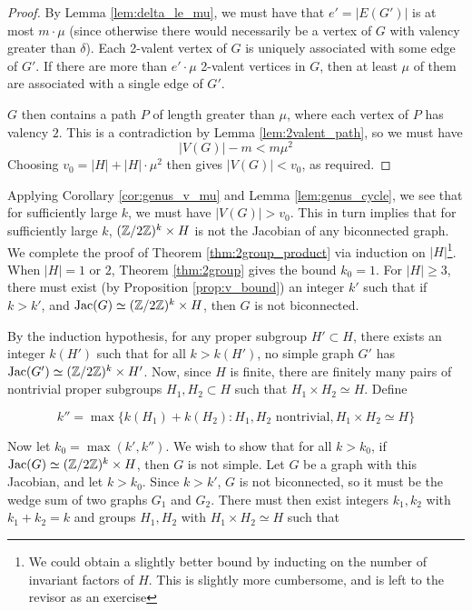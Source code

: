 \documentclass{amsart}
\begin{document}
\begin{proof}
  By Lemma \ref{lem:delta_le_mu}, we must have that $e' = |E(G')|$ is
  at most $m \cdot \mu$ (since otherwise there would necessarily be a
  vertex of $G$ with valency greater than $\delta$). Each 2-valent
  vertex of $G$ is uniquely associated with some edge of $G'$. If
  there are more than $e' \cdot \mu$ 2-valent vertices in $G$, then at
  least $\mu$ of them are associated with a single edge of $G'$. 

  $G$ then contains a path $P$ of length greater than $\mu$, where
  each vertex of $P$ has valency $2$. This is a contradiction by Lemma
  \ref{lem:2valent_path}, so we must have 
  \[
  |V(G)| - m < m\mu^2
  \] 
  Choosing $v_0 = |H| + |H| \cdot \mu^2$ then gives $|V(G)| < v_0$, as
  required.
\end{proof}

Applying Corollary \ref{cor:genus_v_mu} and Lemma
\ref{lem:genus_cycle}, we see that for sufficiently large $k$, we must
have $|V(G)| > v_0$. This in turn implies that for sufficiently large
$k$, $(\mathbb{Z}/2\mathbb{Z})^k \times H$ is not the Jacobian of any biconnected
graph.\\

We complete the proof of Theorem \ref{thm:2group_product} via
induction on $|H|$\footnote{We could obtain a slightly better bound by
  inducting on the number of invariant factors of $H$. This is
  slightly more cumbersome, and is left to the revisor as an
  exercise}. When $|H| = 1$ or $2$, Theorem \ref{thm:2group} gives the
bound $k_0 = 1$. For $|H| \ge 3$, there must exist (by Proposition
\ref{prop:v_bound}) an integer $k'$ such that if $k > k'$, and
$\operatorname{Jac}(G) \simeq (\mathbb{Z}/2\mathbb{Z})^k \times H$, then $G$ is not biconnected.

By the induction hypothesis, for any proper subgroup $H' \subset H$,
there exists an integer $k(H')$ such that for all $k > k(H')$, no
simple graph $G'$ has $\operatorname{Jac}(G') \simeq (\mathbb{Z}/2\mathbb{Z})^k \times H'$. Now,
since $H$ is finite, there are finitely many pairs of nontrivial
proper subgroups $H_1, H_2 \subset H$ such that $H_1 \times H_2 \simeq
H$. Define

\begin{equation*}
  k'' = \max\{k(H_1) + k(H_2) : H_1, H_2 \textrm{ nontrivial}, H_1
  \times H_2 \simeq H\}
\end{equation*}

Now let $k_0 = \max(k', k'')$. We wish to show that for all $k > k_0$,
if $\operatorname{Jac}(G) \simeq (\mathbb{Z}/2\mathbb{Z})^k \times H$, then $G$ is not simple. Let
$G$ be a graph with this Jacobian, and let $k > k_0$.  Since $k > k'$,
$G$ is not biconnected, so it must be the wedge sum of two graphs
$G_1$ and $G_2$. There must then exist integers $k_1, k_2$ with $k_1 +
k_2 = k$ and groups $H_1, H_2$ with $H_1 \times H_2 \simeq H$ such
that
\end{document}
